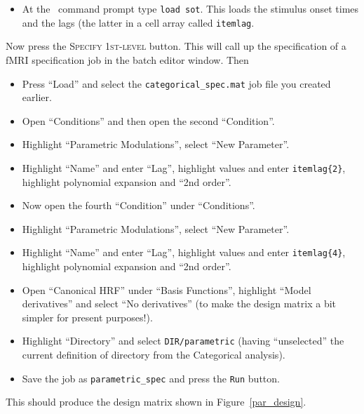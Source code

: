 \begin{itemize}
\item At the \matlab\ command prompt type \texttt{load sot}. This loads the stimulus onset times and the lags (the latter in a cell array called \texttt{itemlag}.
\end{itemize}

Now press the \textsc{Specify 1st-level} button. This will call up the specification of a fMRI specification job in the batch editor window. Then
\begin{itemize}
\item Press ``Load'' and select the \texttt{categorical\_spec.mat} job file you created earlier.
\item Open ``Conditions'' and then open the second ``Condition''.
\item Highlight ``Parametric Modulations'', select ``New Parameter''.
\item Highlight ``Name'' and enter ``Lag'', highlight values and enter \texttt{itemlag\{2\}}, highlight polynomial expansion and ``2nd order''.
\item Now open the fourth ``Condition'' under ``Conditions''.
\item Highlight ``Parametric Modulations'', select ``New Parameter''.
\item Highlight ``Name'' and enter ``Lag'', highlight values and enter \texttt{itemlag\{4\}}, highlight polynomial expansion and ``2nd order''.
\item Open ``Canonical HRF'' under ``Basis Functions'', highlight ``Model derivatives'' and select ``No derivatives'' (to make the design matrix a bit simpler for present purposes!).
\item Highlight ``Directory'' and select \texttt{DIR/parametric} (having ``unselected'' the current definition of directory from the Categorical analysis).
\item Save the job as \texttt{parametric\_spec} and press the \texttt{Run} button.
\end{itemize}

This should produce the design matrix shown in Figure~\ref{par_design}.

